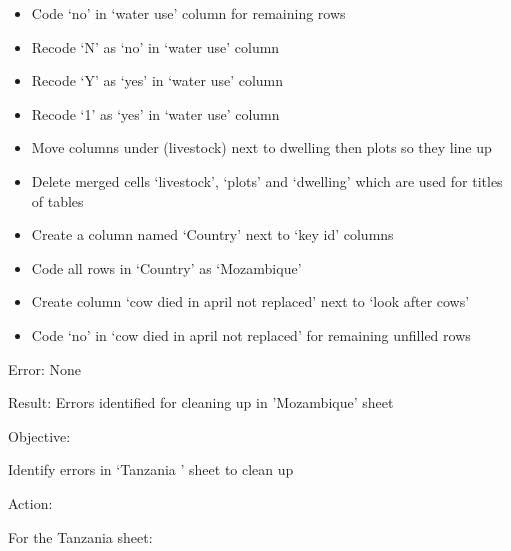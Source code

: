 \documentclass{article}
\begin{document}
\begin{itemize}
\item Code ‘no’ in ‘water use’ column for remaining rows
\item Recode ‘N’ as ‘no’ in ‘water use’ column
\item Recode ‘Y’ as ‘yes’ in ‘water use’ column
\item Recode ‘1’ as ‘yes’ in ‘water use’ column
\item Move columns under (livestock) next to dwelling then plots so they line up
\item Delete merged cells ‘livestock’, ‘plots’ and ‘dwelling’ which are used for titles of tables
\item Create a column named ‘Country’ next to ‘key id’ columns
\item Code all rows in ‘Country’ as ‘Mozambique’
\item Create column ‘cow died in april not replaced’ next to ‘look after cows’
\item Code ‘no’ in ‘cow died in april not replaced’ for remaining unfilled rows
\end{itemize}
Error: None\par
Result: Errors identified for cleaning up in 'Mozambique' sheet \par
Objective: \par
Identify errors in ‘Tanzania ’ sheet to clean up\par
Action:\par
For the Tanzania sheet:
\end{document}
